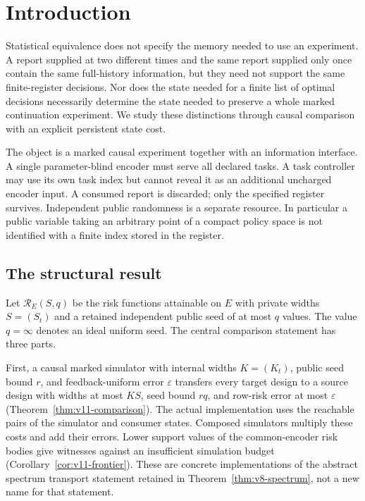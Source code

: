 \section{Introduction}
\label{sec:v11-introduction}

Statistical equivalence does not specify the memory needed to use an
experiment. A report supplied at two different times and the same report
supplied only once contain the same full-history information, but they
need not support the same finite-register decisions. Nor does the state
needed for a finite list of optimal decisions necessarily determine the
state needed to preserve a whole marked continuation experiment. We study
these distinctions through causal comparison with an explicit persistent
state cost.

The object is a marked causal experiment together with an information
interface. A single parameter-blind encoder must serve all declared tasks.
A task controller may use its own task index but cannot reveal it as an
additional uncharged encoder input. A consumed report is discarded; only
the specified register survives. Independent public randomness is a
separate resource. In particular a public variable taking an arbitrary
point of a compact policy space is not identified with a finite index
stored in the register.

\subsection{The structural result}
Let $\mathcal R_E(S,q)$ be the risk functions attainable on $E$ with
private widths $S=(S_t)$ and a retained independent public seed of at most
$q$ values. The value $q=\infty$ denotes an ideal uniform seed. The central
comparison statement has three parts.

First, a causal marked simulator with internal widths $K=(K_t)$, public
seed bound $r$, and feedback-uniform error $\varepsilon$ transfers every
target design to a source design with widths at most $KS$, seed bound
$rq$, and row-risk error at most $\varepsilon$
(Theorem~\ref{thm:v11-comparison}). The actual implementation uses the
reachable pairs of the simulator and consumer states. Composed simulators
multiply these costs and add their errors. Lower support values of the
common-encoder risk bodies give witnesses against an insufficient
simulation budget (Corollary~\ref{cor:v11-frontier}). These are concrete
implementations of the abstract spectrum transport statement retained in
Theorem~\ref{thm:v8-spectrum}, not a new name for that statement.

